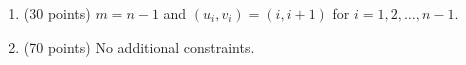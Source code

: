 \begin{enumerate}
    \tightlist
    \item (30 points) $m = n - 1$ and $(u_i, v_i) = (i, i + 1)$ for $i = 1, 2, \ldots, n - 1$.
    \item (70 points) No additional constraints.
\end{enumerate}
    